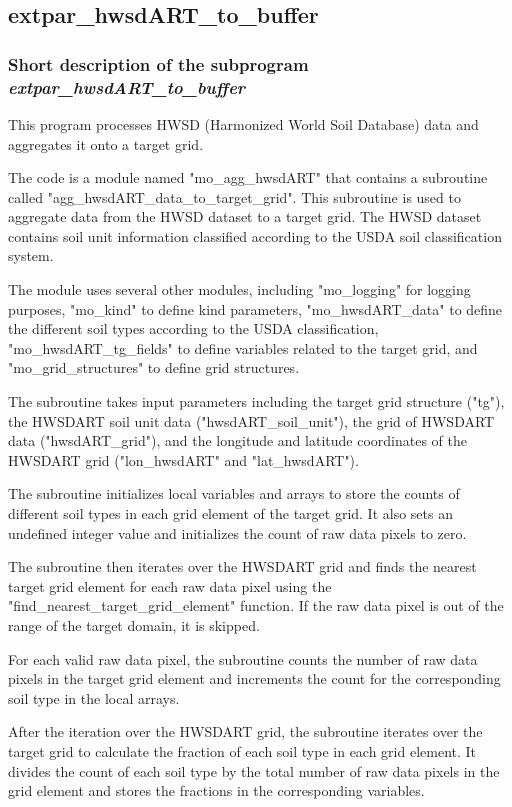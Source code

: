 \documentclass[a4paper,10pt,DIV14,BCOR1cm,titlepage,twoside]{scrartcl}
\begin{document}
\subsection{extpar\_hwsdART\_to\_buffer}\label{extpar_hwsdART_to_buffer}
\subsubsection{Short description of the subprogram \textit{extpar\_hwsdART\_to\_buffer}}

This program processes HWSD (Harmonized World Soil Database) data and aggregates it onto a target grid.

The code is a module named "mo\_agg\_hwsdART" that contains a subroutine
called "agg\_hwsdART\_data\_to\_target\_grid". This subroutine is used to
aggregate data from the HWSD dataset to a target grid. The HWSD dataset contains soil unit information classified according to the USDA soil classification system.

The module uses several other modules, including "mo\_logging" for logging purposes, "mo\_kind" to define kind parameters, "mo\_hwsdART\_data" to define the different soil types according to the USDA classification, "mo\_hwsdART\_tg\_fields" to define variables related to the target grid, and "mo\_grid\_structures" to define grid structures.

The subroutine takes input parameters including the target grid structure ("tg"), the HWSDART soil unit data ("hwsdART\_soil\_unit"), the grid of HWSDART data ("hwsdART\_grid"), and the longitude and latitude coordinates of the HWSDART grid ("lon\_hwsdART" and "lat\_hwsdART").

The subroutine initializes local variables and arrays to store the counts of different soil types in each grid element of the target grid. It also sets an undefined integer value and initializes the count of raw data pixels to zero.

The subroutine then iterates over the HWSDART grid and finds the nearest target grid element for each raw data pixel using the "find\_nearest\_target\_grid\_element" function. If the raw data pixel is out of the range of the target domain, it is skipped.

For each valid raw data pixel, the subroutine counts the number of raw data pixels in the target grid element and increments the count for the corresponding soil type in the local arrays.

After the iteration over the HWSDART grid, the subroutine iterates over the target grid to calculate the fraction of each soil type in each grid element. It divides the count of each soil type by the total number of raw data pixels in the grid element and stores the fractions in the corresponding variables.
\end{document}
